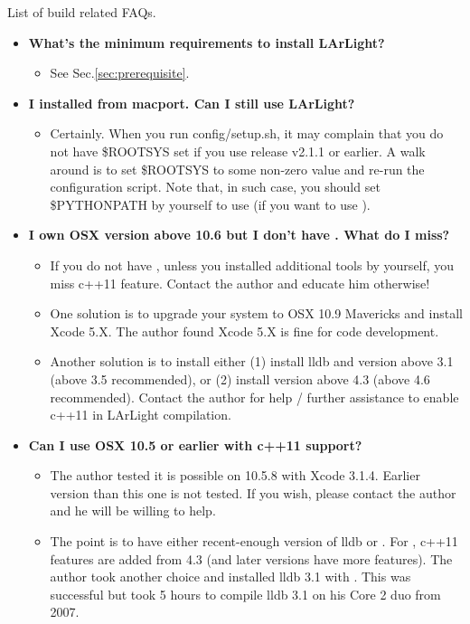 List of build related FAQs.

\begin{itemize}

\item[] {\bf What's the minimum requirements to install LArLight?}
  \begin{itemize}
    \item See Sec.\ref{sec:prerequisite}.
  \end{itemize}

\item[] {\bf I installed \ROOT from macport. Can I still use LArLight?}
  \begin{itemize}
    \item Certainly. When you run {\ttfamily config/setup.sh}, it may
      complain that you do not have {\ttfamily \$ROOTSYS} set if you use
      release v2.1.1 or earlier. A walk around is to set {\ttfamily \$ROOTSYS}
      to some non-zero value and re-run the configuration script. Note that,
      in such case, you should set {\ttfamily \$PYTHONPATH} by yourself to
      use \PyROOT (if you want to use \PyROOT).
  \end{itemize}

\item[] {\bf I own OSX version above 10.6 but I don't have \clang. What do I miss?}
  \begin{itemize}
    \item If you do not have \clang, unless you installed additional tools 
      by yourself, you miss {\ttfamily c++11} feature. Contact the author 
      and educate him otherwise!
    \item One solution is to upgrade your system to OSX 10.9 Mavericks and
      install Xcode 5.X. The author found Xcode 5.X is fine for code
      development.
    \item Another solution is to install either (1) install {\ttfamily lldb}
      and \clang version above 3.1 (above 3.5 recommended), or (2)
      install \gpp version above 4.3 (above 4.6 recommended). Contact      
      the author for help / further assistance to enable {\ttfamily c++11}
      in LArLight compilation.      
  \end{itemize}

\item[] {\bf Can I use OSX 10.5 or earlier with {\ttfamily c++11} support?}
  \begin{itemize}
    \item The author tested it is possible on 10.5.8 with Xcode 3.1.4. Earlier
      version than this one is not tested. If you wish, please contact the author
      and he will be willing to help.
    \item The point is to have either recent-enough version of {\ttfamily lldb} 
      or \gpp. For \gpp, {\ttfamily c++11} features are added from 4.3 (and later
      versions have more features). The author took another choice and installed
      {\ttfamily lldb} 3.1 with . This was successful but took 5 hours 
      to compile {\ttfamily lldb} 3.1 on his Core 2 duo from 2007.
  \end{itemize}


\end{itemize}
